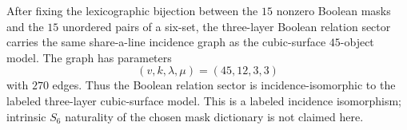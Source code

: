 \makeatletter
{}
\makeatother

\begin{theorem}
\label{thm:boolean-tritangent-incidence45}
After fixing the lexicographic bijection between the $15$ nonzero Boolean masks
and the $15$ unordered pairs of a six-set, the three-layer Boolean relation
sector carries the same share-a-line incidence graph as the cubic-surface
$45$-object model.  The graph has parameters
\[
  (v,k,\lambda,\mu)=(45,12,3,3)
\]
with $270$ edges.  Thus the Boolean relation sector is incidence-isomorphic to
the labeled three-layer cubic-surface model.  This is a labeled incidence
isomorphism; intrinsic $S_6$ naturality of the chosen mask dictionary is not
claimed here.
\end{theorem}
